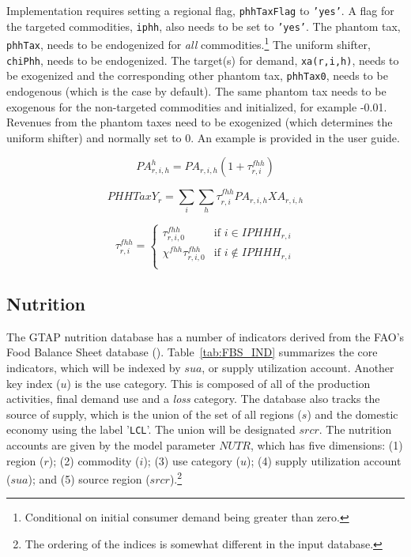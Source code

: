 \documentclass[11pt,letterpaper]{report}
\begin{document}
Implementation requires setting a regional flag, \texttt{phhTaxFlag} to \texttt{'yes'}.
A flag for the targeted commodities, \texttt{iphh}, also needs to be set to \texttt{'yes'}.
The phantom tax, \texttt{phhTax}, needs to be endogenized for \emph{all} commodities.\footnote{Conditional
on initial consumer demand being greater than zero.}
The uniform shifter, \texttt{chiPhh}, needs to be endogenized.
The target(s) for demand, \texttt{xa(r,i,h)}, needs to be exogenized and the corresponding
other phantom tax, \texttt{phhTax0}, needs to be
endogenous (which is the case by default). The same phantom tax needs to be exogenous
for the non-targeted commodities and initialized, for example -0.01. Revenues
from the phantom taxes need to be exogenized (which determines the uniform shifter)
and normally set to 0.
An example is provided in the user guide.

\begin{equation}
\label{eq:pahbis}
\mathit{PA}^{h}_{r,i,h} =
\mathit{PA}_{r,i,h} \left(1 + \tau^{fhh}_{r,i}\right)
\end{equation}

\begin{equation}
\label{eq:PHHTaxY}
\mathit{PHHTaxY}_{r} = \sum_{\mathit{i}}{\sum_{\mathit{h}}{
\tau^{\mathit{fhh}}_{r,i} \mathit{PA}_{r,i,h} \mathit{XA}_{r,i,h}}}
\end{equation}

\begin{equation}
\label{eq:xPHHTax}
\tau^{fhh}_{r,i} =
\begin{cases}
\tau^{fhh}_{r,i,0} & \textrm{if } i \in {\mathit{IPHHH}_{r,i}} \\
\chi^{\mathit{fhh}} \tau^{fhh}_{r,i,0} & \textrm{if } i \notin {\mathit{IPHHH}_{r,i}} \\
\end{cases}
\end{equation}

\subsection{Nutrition}

The GTAP nutrition database has a number of indicators derived from
the FAO's Food Balance Sheet database (\cite{Chepeliev2022}). Table~\ref{tab:FBS_IND}
summarizes the core indicators, which will be indexed by $\mathit{sua}$, or
supply utilization account.
Another key index ($u$) is the use category. This is composed of all
of the production activities, final demand use and a \emph{loss} category.
The database also tracks the source of supply, which is the
union of the set of all regions ($s$) and the domestic
economy using the label '\texttt{LCL}'. The union will be
designated $\mathit{srcr}$. The nutrition accounts
are given by the model parameter $\mathit{NUTR}$, which
has five dimensions: (1) region ($r$); (2) commodity ($i$);
(3) use category ($u$); (4) supply utilization account ($\mathit{sua}$);
and (5) source region ($\mathit{srcr}$).\footnote{The ordering of
the indices is somewhat different in the input database.}
\end{document}
